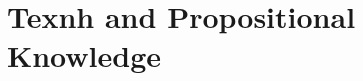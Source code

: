 \documentclass[11pt,letterpaper,oneside]{amsart} %
\begin{document}







\section{Texnh and Propositional Knowledge}
\label{propositional}




\end{document}
